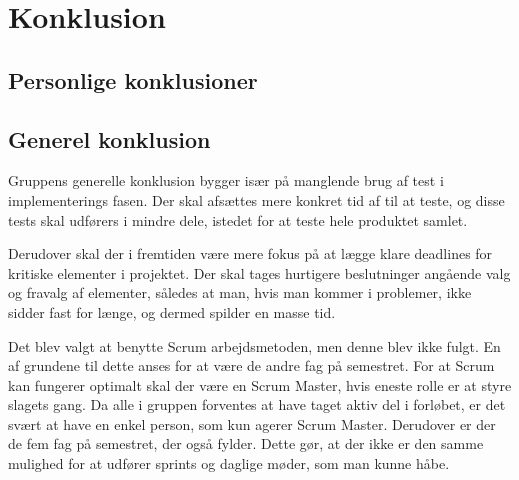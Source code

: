 \chapter{Konklusion}

\section{Personlige konklusioner}






\clearpage


\section{Generel konklusion}
Gruppens generelle konklusion bygger især på manglende brug af test i implementerings fasen.
Der skal afsættes mere konkret tid af til at teste, og disse tests skal udførers i mindre dele, istedet for at teste hele produktet samlet.

Derudover skal der i fremtiden være mere fokus på at lægge klare deadlines for kritiske elementer i projektet. Der skal tages hurtigere beslutninger angående valg og fravalg af elementer, således at man, hvis man kommer i problemer, ikke sidder fast for længe, og dermed spilder en masse tid.

Det blev valgt at benytte Scrum arbejdsmetoden, men denne blev ikke fulgt. En af grundene til dette anses for at være de andre fag på semestret. For at Scrum kan fungerer optimalt skal der være en Scrum Master, hvis eneste rolle er at styre slagets gang. Da alle i gruppen forventes at have taget aktiv del i forløbet, er det svært at have en enkel person, som kun agerer Scrum Master. Derudover er der de fem fag på semestret, der også fylder. Dette gør, at der ikke er den samme mulighed for at udfører sprints og daglige møder, som man kunne håbe. 


